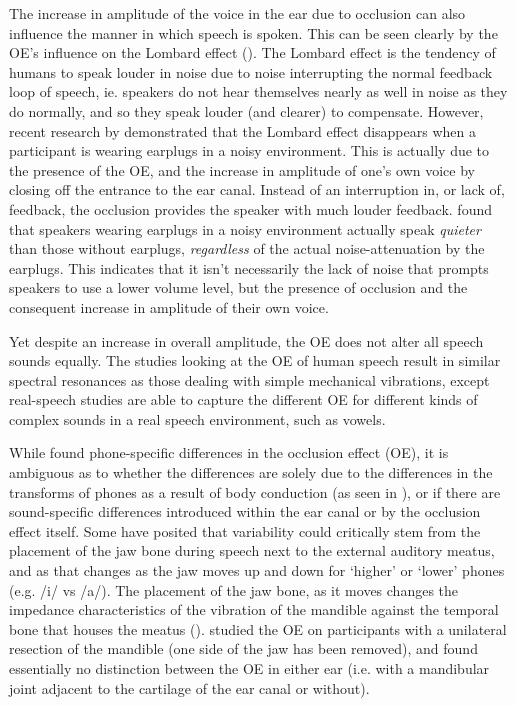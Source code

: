 \documentclass[dissertation,copyright]{uathesis}
\begin{document}
The increase in amplitude of the voice in the ear due to occlusion can also influence the manner in which speech is spoken.  This can be seen clearly by the OE's influence on the Lombard effect (\cite{lombard:11,lane:71}).  The Lombard effect is the tendency of humans to speak louder in noise due to noise interrupting the normal feedback loop of speech, ie. speakers do not hear themselves nearly as well in noise as they do normally, and so they speak louder (and clearer) to compensate.  However, recent research by \cite{brungart:12} demonstrated that the Lombard effect disappears when a participant is wearing earplugs in a noisy environment.  This is actually due to the presence of the OE, and the increase in amplitude of one's own voice by closing off the entrance to the ear canal.  Instead of an interruption in, or lack of, feedback, the occlusion provides the speaker with much louder feedback.  \cite{brungart:12} found that speakers wearing earplugs in a noisy environment actually speak \textit{quieter} than those without earplugs, \textit{regardless} of the actual noise-attenuation by the earplugs.  This indicates that it isn't necessarily the lack of noise that prompts speakers to use a lower volume level, but the presence of occlusion and the consequent increase in amplitude of their own voice.

Yet despite an increase in overall amplitude, the OE does not alter all speech sounds equally.  The studies looking at the OE of human speech result in similar spectral resonances as those dealing with simple mechanical vibrations, except real-speech studies are able to capture the different OE for different kinds of complex sounds in a real speech environment, such as vowels.  



While \cite{hansen:97b} found phone-specific differences in the occlusion effect (OE), it is ambiguous as to whether the differences are solely due to the differences in the transforms of phones as a result of body conduction (as seen in \cite{reinfeldt:10}), or if there are sound-specific differences introduced within the ear canal or by the occlusion effect itself.  
Some have posited that variability could critically stem from the placement of the jaw bone during speech next to the external auditory meatus, and as that changes as the jaw moves up and down for `higher' or `lower' phones (e.g. /i/ vs /a/). The placement of the jaw bone, as it moves changes the impedance characteristics of the vibration of the mandible against the temporal bone that houses the meatus (\cite{bekesy:60}).  \cite{allen:60} studied the OE on participants with a unilateral resection of the mandible (one side of the jaw has been removed), and found essentially no distinction between the OE in either ear (i.e. with a mandibular joint adjacent to the cartilage of the ear canal or without).
\end{document}
